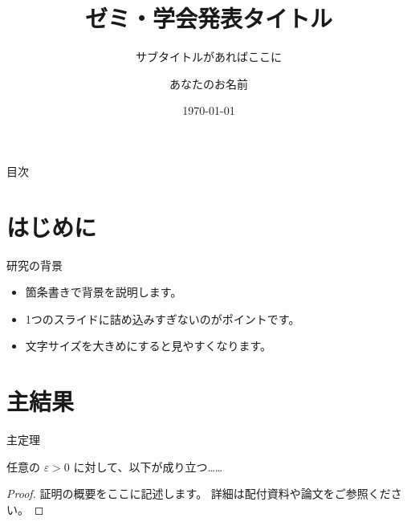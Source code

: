 \documentclass[uplatex,dvipdfmx]{beamer}
\title{ゼミ・学会発表タイトル}
\subtitle{サブタイトルがあればここに}
\author{あなたのお名前}
\institute{◯◯大学 大学院 理学研究科 数学専攻}
\date{\today}
\begin{document}
\begin{frame}
  \titlepage
\end{frame}

\begin{frame}{目次}
  \tableofcontents
\end{frame}

\section{はじめに}

\begin{frame}{研究の背景}
  \begin{itemize}
    \item 箇条書きで背景を説明します。
    \item 1つのスライドに詰め込みすぎないのがポイントです。
    \item 文字サイズを大きめにすると見やすくなります。
  \end{itemize}
\end{frame}

\section{主結果}

\begin{frame}{主定理}
  \begin{theorem}
    任意の $\varepsilon > 0$ に対して、以下が成り立つ……
  \end{theorem}

  \begin{proof}
    証明の概要をここに記述します。
    詳細は配付資料や論文をご参照ください。
  \end{proof}
\end{frame}
\end{document}

